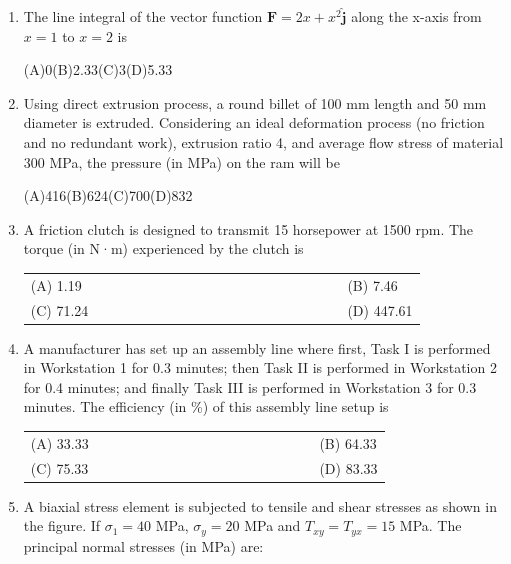 \documentclass[a4paper,12pt]{article}
\begin{document}
\begin{enumerate}[label=Q.\arabic*, leftmargin=*]
\begin{enumerate}[label=(\Alph*)]
\end{enumerate}

\item The line integral of the vector function $\mathbf{F} = 2x + x^2 \mathbf{\hat{j}}$ along the x-axis from $x=1$ to $x=2$ is

(A)0\hfill(B)2.33\hfill(C)3\hfill(D)5.33 \\

\item Using direct extrusion process, a round billet of 100 mm length and 50 mm diameter is extruded. Considering an ideal deformation process (no friction and no redundant work), extrusion ratio 4, and average flow stress of material 300 MPa, the pressure (in MPa) on the ram will be

(A)416\hfill(B)624\hfill(C)700\hfill(D)832\\

\item A friction clutch is designed to transmit 15 horsepower at 1500 rpm. The torque (in N·m) experienced by the clutch is
\begin{multicols}{2}
\begin{tabular}[t]{p{0.8\linewidth} p{0.9\linewidth}}
(A) 1.19 & (B) 7.46 \\
(C) 71.24 & (D) 447.61 \\
\end{tabular}
\end{multicols}

\item A manufacturer has set up an assembly line where first, Task I is performed in Workstation 1 for 0.3 minutes; then Task II is performed in Workstation 2 for 0.4 minutes; and finally Task III is performed in Workstation 3 for 0.3 minutes. The efficiency (in \%) of this assembly line setup is
\begin{multicols}{2}
\begin{tabular}[t]{p{0.8\linewidth} p{0.9\linewidth}}
(A) 33.33 & (B) 64.33 \\
(C) 75.33 & (D) 83.33 \\
\end{tabular}
\end{multicols}

\newpage
\item A biaxial stress element is subjected to tensile and shear stresses as shown in the figure. If $\sigma_1 = 40$ MPa, $\sigma_y = 20$ MPa and \(T_{xy} = T_{yx} = 15\) MPa. The principal normal stresses (in MPa) are:


\end{enumerate}
\end{document}
